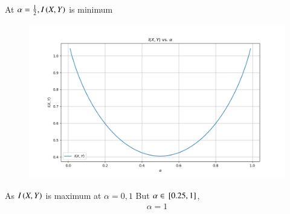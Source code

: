 \documentclass[article]{IEEEtran}
\theoremstyle{remark}
\begin{document}
At $\alpha = \frac{1}{2}, I\left(X,Y\right)$ is minimum\\
\begin{figure}[!ht]
\centering
\includegraphics[width=\columnwidth]{./figs/figure2.png}
\label{Fig:2}
\end{figure}
As $I\left(X,Y\right)$ is maximum at $\alpha = 0,1$
But $\alpha \in {}\left[0.25,1\right]$, 
\begin{align}
\alpha = 1
\end{align}
\end{document}
